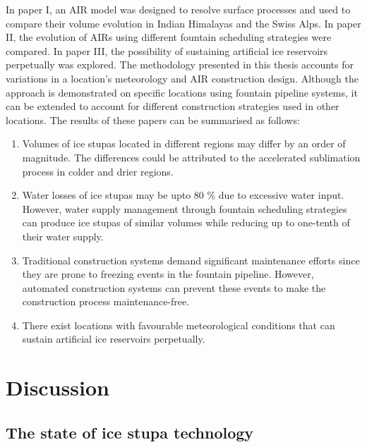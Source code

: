 In paper I, an AIR model was designed to resolve surface processes and used to compare their volume evolution in
Indian Himalayas and the Swiss Alps. In paper II, the evolution of AIRs using different fountain scheduling
strategies were compared. In paper III, the possibility of sustaining artificial ice reservoirs perpetually was
explored. The methodology presented in this thesis accounts for variations in a location's meteorology and AIR
construction design. Although the approach is demonstrated on specific locations using fountain pipeline
systems, it can be extended to account for different construction strategies used in other locations. The
results of these papers can be summarised as follows:

\begin{enumerate} 

\item Volumes of ice stupas located in different regions may differ by an order of magnitude. The differences
  could be attributed to the accelerated sublimation process in colder and drier regions.

\item Water losses of ice stupas may be upto 80 \% due to excessive water input. However, water supply
  management through fountain scheduling strategies can produce ice stupas of similar volumes while reducing up to
  one-tenth of their water supply.

\item Traditional construction systems demand significant maintenance efforts since they are prone to freezing
  events in the fountain pipeline. However, automated construction systems can prevent these events to make the
  construction process maintenance-free.

\item There exist locations with favourable meteorological conditions that can sustain artificial ice reservoirs
  perpetually.

\end{enumerate}


\section{Discussion}

\subsection{The state of ice stupa technology}

